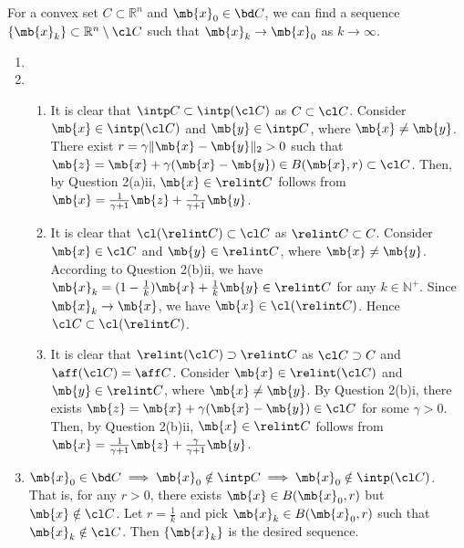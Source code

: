 \begin{exercise}
\begin{enumerate}
\begin{enumerate}
          For a convex set $C\subset\mathbb{R}^n$ and $\mb{x}_0\in\bd C$, we can find a sequence $\{\mb{x}_k\}\subset\mathbb{R}^n\setminus\cl C$ such that $\mb{x}_k\to\mb{x}_0$ as $k\to\infty$.
      \end{enumerate}
      \begin{solution}
        \begin{enumerate}
          \item []
          \item 
            \begin{enumerate}
              \item It is clear that $\intp C\subset\intp(\cl C)$ as $C\subset\cl C$. Consider $\mb{x} \in \intp (\cl C)$ and $\mb{y} \in \intp C$, where $\mb{x} \neq \mb{y}$. There exist $r = \gamma\|\mb{x}-\mb{y}\|_2>0$ such that $\mb{z}=\mb{x}+\gamma(\mb{x}-\mb{y}) \in B(\mb{x},r)\subset \cl C$. Then, by Question 2(a)ii, $\mb{x} \in \relint C$ follows from $\mb{x} = \frac{1}{\gamma+1}\mb{z} + \frac{\gamma}{\gamma+1}\mb{y}$.
              \item It is clear that $\cl (\relint C)\subset\cl C$ as $\relint C\subset C$. Consider $\mb{x} \in \cl C$ and $\mb{y}\in \relint C$, where $\mb{x} \neq \mb{y}$. According to Question 2(b)ii, we have $\mb{x}_k = (1-\frac{1}{k})\mb{x} + \frac{1}{k}\mb{y} \in \relint C$ for any $k \in \mathbb{N}^+$. Since $\mb{x}_k \to \mb{x}$, we have $\mb{x} \in \cl (\relint C)$. Hence $\cl C\subset\cl (\relint C)$.
              \item It is clear that $\relint (\cl C)\supset\relint C$ as $\cl C\supset C$ and $\aff (\cl C) = \aff C$. Consider $\mb{x} \in \relint (\cl C)$ and $\mb{y} \in \relint C$, where $\mb{x} \neq \mb{y}$. By Question 2(b)i, there exists $\mb{z} = \mb{x} + \gamma (\mb{x} - \mb{y}) \in \cl C$ for some $\gamma > 0$. Then, by Question 2(b)ii, $\mb{x} \in \relint C$ follows from $\mb{x} = \frac{1}{\gamma+1}\mb{z} + \frac{\gamma}{\gamma+1}\mb{y}$.
            \end{enumerate}
          \item $\mb{x}_0 \in \bd C \implies \mb{x}_0 \notin \intp C \implies \mb{x}_0 \notin \intp (\cl C)$. That is, for any $r > 0$, there exists $\mb{x} \in B(\mb{x}_0,r)$ but $\mb{x} \notin \cl C$. Let $r=\frac{1}{k}$ and pick $\mb{x}_k \in B(\mb{x}_0,r)$ such that $\mb{x}_k \notin \cl C$. Then $\{\mb{x}_k\}$ is the desired sequence.
            \qedhere
        \end{enumerate}
      \end{solution}
  \end{enumerate}

\end{exercise}
\newpage




